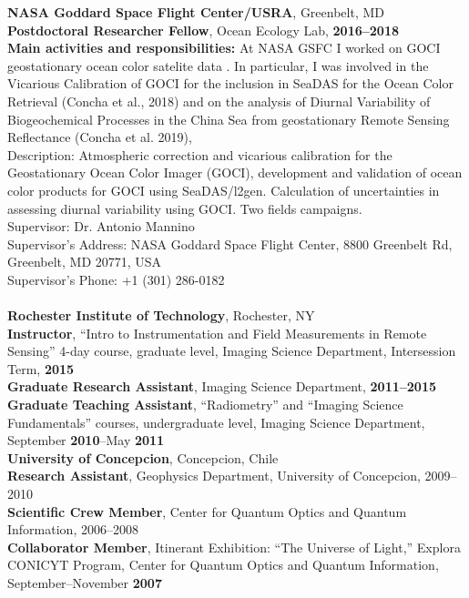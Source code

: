\documentclass[11pt]{res}
\begin{document}
\begin{resume}
{\bf NASA Goddard Space Flight Center/USRA}, Greenbelt, MD\\
{\bf Postdoctoral Researcher Fellow}, Ocean Ecology Lab, {\bf 2016--2018}\\
{\bf Main activities and responsibilities:} At NASA GSFC I worked on GOCI geostationary ocean color satelite data . In  particular, I was involved in the Vicarious Calibration of GOCI for the inclusion in SeaDAS  for the Ocean Color Retrieval (Concha et al., 2018) and on the analysis of Diurnal Variability of Biogeochemical Processes in the China Sea from geostationary  Remote Sensing Reflectance (Concha et al. 2019),\\
Description: Atmospheric correction and vicarious calibration for the Geostationary Ocean Color Imager (GOCI), development and validation of ocean color products for GOCI using SeaDAS/l2gen. Calculation of uncertainties in assessing diurnal variability using GOCI. Two fields campaigns.\\
Supervisor: Dr. Antonio Mannino\\
Supervisor's Address: NASA Goddard Space Flight Center, 8800 Greenbelt Rd, Greenbelt, MD 20771, USA\\
Supervisor's Phone: +1 (301) 286-0182\\
\vspace{0.1in}\\
{\bf Rochester Institute of Technology}, Rochester, NY\\
{\bf Instructor}, ``Intro to Instrumentation and Field Measurements in Remote Sensing'' 4-day course, graduate level, Imaging Science Department, Intersession Term, {\bf 2015}\\
{\bf Graduate Research Assistant}, Imaging Science Department, {\bf 2011--2015}\\
{\bf Graduate Teaching Assistant}, ``Radiometry'' and  ``Imaging Science Fundamentals'' courses, undergraduate level, Imaging Science Department, September {\bf 2010}--May {\bf 2011}
\vspace{0.1in}\\
{\bf University of Concepcion}, Concepcion, Chile\\
{\bf Research Assistant}, Geophysics Department, University of Concepcion, 2009--2010\\
{\bf Scientific Crew Member}, Center for Quantum Optics and Quantum Information, 2006--2008\\
{\bf Collaborator Member}, Itinerant Exhibition: ``The Universe of Light,'' Explora CONICYT Program, Center for Quantum Optics and Quantum Information, September--November {\bf 2007}\\
\vspace{-0.2in}

\end{resume}
\end{document}
